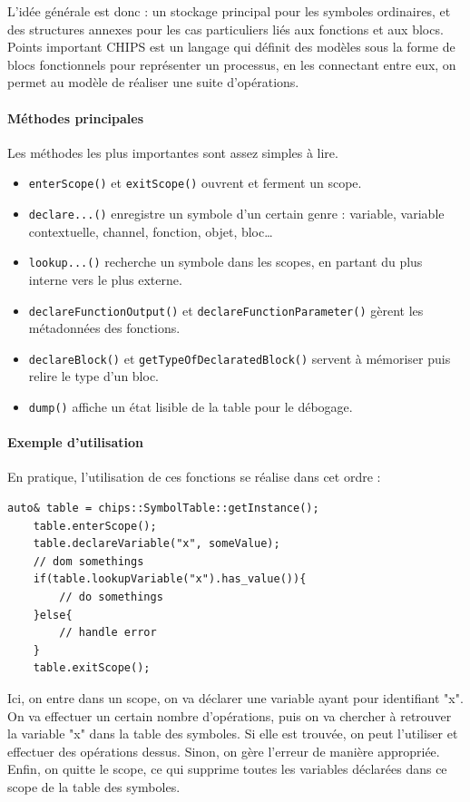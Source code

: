 L'idée générale est donc : un stockage principal pour les symboles ordinaires, et des structures annexes pour les cas particuliers liés aux fonctions et aux blocs. \\

\RemarkBox
{Points important}
{
    CHIPS est un langage qui définit des modèles sous la forme de blocs fonctionnels pour représenter un processus, 
    en les connectant entre eux, on permet au modèle de réaliser une suite d'opérations.
}

\paragraph{Méthodes principales}

Les méthodes les plus importantes sont assez simples à lire.

\begin{itemize}
    \item \texttt{enterScope()} et \texttt{exitScope()} ouvrent et ferment un scope.
    \item \texttt{declare...()} enregistre un symbole d'un certain genre : variable, variable contextuelle, channel, fonction, objet, bloc\dots
    \item \texttt{lookup...()} recherche un symbole dans les scopes, en partant du plus interne vers le plus externe.
    \item \texttt{declareFunctionOutput()} et \texttt{declareFunctionParameter()} gèrent les métadonnées des fonctions.
    \item \texttt{declareBlock()} et \texttt{getTypeOfDeclaratedBlock()} servent à mémoriser puis relire le type d'un bloc.
    \item \texttt{dump()} affiche un état lisible de la table pour le débogage.
\end{itemize}

\paragraph{Exemple d'utilisation}

En pratique, l'utilisation de ces fonctions se réalise dans cet ordre :

\begin{lstlisting}[caption={Exemple d'utilisation de SymbolTable}]
    auto& table = chips::SymbolTable::getInstance();
    table.enterScope();
    table.declareVariable("x", someValue);
    // dom somethings
    if(table.lookupVariable("x").has_value()){
        // do somethings
    }else{
        // handle error
    }
    table.exitScope();
\end{lstlisting}
Ici, on entre dans un scope, on va déclarer une variable ayant pour identifiant "x". On va effectuer un certain nombre d'opérations, puis on va chercher à retrouver la variable "x" dans la table des symboles. Si elle est trouvée, on peut l'utiliser et effectuer des opérations dessus. Sinon, on gère l'erreur de manière appropriée. Enfin, on quitte le scope, ce qui supprime toutes les variables déclarées dans ce scope de la table des symboles.

